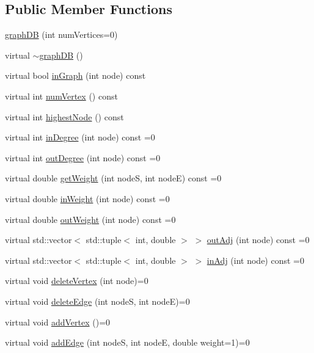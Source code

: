 \subsection*{Public Member Functions}
\begin{DoxyCompactItemize}
\item 
\hyperlink{class_alg_lib_1_1graph_d_b_af5ab632982eda709108278a5153f6c70}{graph\+DB} (int num\+Vertices=0)
\item 
virtual \hyperlink{class_alg_lib_1_1graph_d_b_a58e8a1ab216494a97785fb21c7c344bc}{$\sim$graph\+DB} ()
\item 
virtual bool \hyperlink{class_alg_lib_1_1graph_d_b_ab897b7e45cbcfa65bf0c636630b52d93}{in\+Graph} (int node) const 
\item 
virtual int \hyperlink{class_alg_lib_1_1graph_d_b_a8d64de3b748352ed05aa0272c3a51195}{num\+Vertex} () const 
\item 
virtual int \hyperlink{class_alg_lib_1_1graph_d_b_a068476d8649ba9d30d32ed3f14dc2f6c}{highest\+Node} () const 
\item 
virtual int \hyperlink{class_alg_lib_1_1graph_d_b_a06faf4feb26d18b4491c5671158155f0}{in\+Degree} (int node) const  =0
\item 
virtual int \hyperlink{class_alg_lib_1_1graph_d_b_a8ac8d9aa118a2584d36d881f2f22a0c8}{out\+Degree} (int node) const  =0
\item 
virtual double \hyperlink{class_alg_lib_1_1graph_d_b_a8b81f180d935d1f80f728c0fef64ca03}{get\+Weight} (int nodeS, int nodeE) const  =0
\item 
virtual double \hyperlink{class_alg_lib_1_1graph_d_b_a873a4aa752f53702fad8cd36ab409c0e}{in\+Weight} (int node) const  =0
\item 
virtual double \hyperlink{class_alg_lib_1_1graph_d_b_a86dea18aed8b3bbcfaf834776d36f20f}{out\+Weight} (int node) const  =0
\item 
virtual std\+::vector$<$ std\+::tuple$<$ int, double $>$ $>$ \hyperlink{class_alg_lib_1_1graph_d_b_ae3c91d0775e8c2b28824a11f55571665}{out\+Adj} (int node) const  =0
\item 
virtual std\+::vector$<$ std\+::tuple$<$ int, double $>$ $>$ \hyperlink{class_alg_lib_1_1graph_d_b_abf67bacae3ae1faa4a9d5260f52ab1ca}{in\+Adj} (int node) const  =0
\item 
virtual void \hyperlink{class_alg_lib_1_1graph_d_b_abb3e87cafce37173f075c27c9c129554}{delete\+Vertex} (int node)=0
\item 
virtual void \hyperlink{class_alg_lib_1_1graph_d_b_a01fcc5af770b56fc187e40fb34ec9c9f}{delete\+Edge} (int nodeS, int nodeE)=0
\item 
virtual void \hyperlink{class_alg_lib_1_1graph_d_b_af21b1c41a94e6240b661bbe76f9fcb35}{add\+Vertex} ()=0
\item 
virtual void \hyperlink{class_alg_lib_1_1graph_d_b_aeedc15cdbef55a131d7cf3d91778032e}{add\+Edge} (int nodeS, int nodeE, double weight=1)=0
\end{DoxyCompactItemize}
